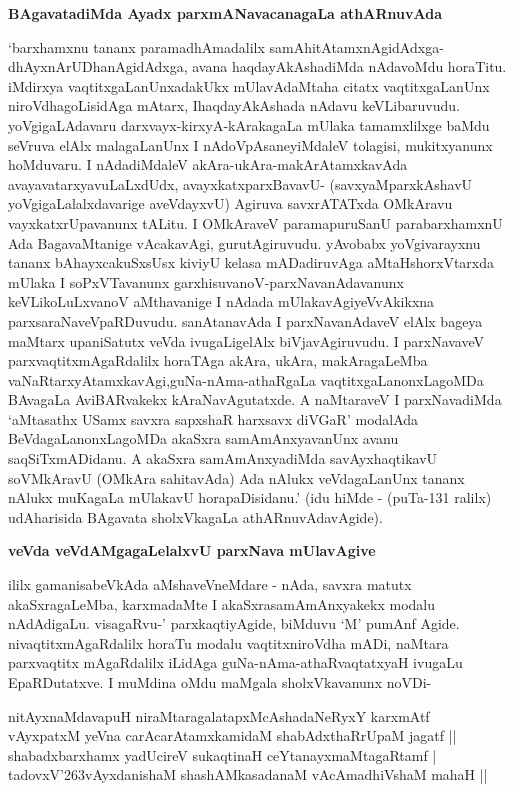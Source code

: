 {\bigskip
\noindent
{\large\bf BAgavatadiMda Ayadx parxmANavacanagaLa athARnuvAda}}\label{page164}
\medskip

\noindent
`barxhamxnu tananx paramadhAmadalilx samAhitAtamxnAgidAdxga- dhAyxnArUDhanAgidAdxga, avana haqdayA\-kAsha\-diMda nAdavoMdu horaTitu. iMdirxya vaqtitxgaLanUnx\break adakUkx mUlavAdaMtaha citatx vaqtitx\-gaLanUnx niroVdhagoLisidAga mAtarx, I\break haqdayA\-kAshada nAdavu keVLibaruvudu. yoVgigaLAdavaru darxvayx-\-kirxyA-kAraka\-gaLa mUlaka tamamx\-lilxge baMdu seVruva elAlx malagaLanUnx I nAdoVpAsane\-yiMdaleV tola\-gisi, mukitxyanunx hoMduvaru. I nAdadiMdaleV akAra\--ukAra\break-makArAtamxkavAda avayava\-tarxyavuLaLxdUdx, avayxkatxparxBavavU- (savxyaMparxkAshavU yoVgigaLalalx\-dava\-rige aveVdayxvU) Agiruva savxrA\-TATxda OMkAravu vayxkatxrUpa\-vanunx tALitu. I OMkAraveV paramapuruSanU parabarxhamxnU Ada BagavaMta\-nige vAcaka\-vAgi, gurutAgiruvudu. yAvobabx yoVgivarayxnu tananx bAhayxcakuSxsUsx kiviyU kelasa mADadiruvAga aMtaHshorxVtarxda mUlaka I soPxVTavanunx garxhisuvanoV-\break parxNavanAdavanunx keVLikoLuLx\-vanoV aMthavanige I nAdada mUlakavAgiyeV\break vAkikxna parxsaraNaveVpaRDuvudu. sanAtanavAda I parxNava\-nAdaveV elAlx bageya maMtarx upaniSatutx veVda ivugaLigelAlx biVjavAgiruvudu. I parxNa\-vaveV parxvaqtitx\-mAgaRdalilx horaTAga akAra, ukAra, makAragaLeMba vaNaRtarxyAtamxkavAgi,\break guNa-nAma-\-athaR\-gaLa vaqtitxgaLanonxLagoMDa BAvagaLa AviBARvakekx kAraNa\-vAgu\-tatxde. A naMtaraveV I parxNavadiMda \-`aMtasathx USamx savxra sapxshaR harxsavx diVGaR' moda\-lAda BeVdagaLanonxLagoMDa akaSxra samAmAnxyavanUnx avanu saqSiTxmADidanu. A akaSxra samAmAnxyadiMda savAyxhaqtikavU soVMkAravU (OMkAra sahitavAda) Ada nAlukx veVdagaLanUnx tananx nAlukx muKagaLa mUlakavU horapaDisidanu.' (idu hiMde - (puTa-131 ralilx) udAharisida BAgavata sholxVkagaLa athARnuvAdavAgide).

{\bigskip
\noindent
{\large\bf veVda veVdAMgagaLelalxvU parxNava mUlavAgive}}\label{165}
\medskip

\noindent
ililx gamanisabeVkAda aMshaveVneMdare - nAda, savxra matutx akaSxragaLeMba, karxmadaMte I akaSxrasamA\-mAnxyakekx modalu nAdAdigaLu. visagaRvu-' parxkaqtiyAgide, biMduvu `M' pumAnf Agide. nivaqtitx\-mAgaRdalilx horaTu modalu vaqtitxniroVdha mADi, naMtara parxvaqtitx mAgaRdalilx iLidAga guNa-\-nAma-\-athaRvaqtatxyaH ivugaLu EpaRDutatxve. I muMdina oMdu maMgala sholxVkavanunx noVDi-

\begin{shloka}
nitAyxnaMdavapuH niraMtaragalatapxMcAshadaNeRyxY karxmAtf\\\label{165}
vAyxpatxM yeVna carAcarAtamxkamidaM shabAdxthaRrUpaM jagatf ||\\
shabadxbarxhamx yadUcireV sukaqtinaH ceYtanayxmaMtagaRtamf |\\
tadovxV\char'263vAyxdanishaM shashAMkasadanaM vAcAmadhiVshaM mahaH ||
\end{shloka}

